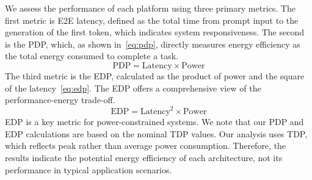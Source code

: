 We assess the performance of each platform using three primary metrics. 
The first metric is E2E latency, defined as the total time from prompt input to the generation of the first token, which indicates system responsiveness. 
The second is the PDP, which, as shown in~\eqref{eq:pdp}, directly measures energy efficiency as the total energy consumed to complete a task.
\begin{equation}
  \text{PDP} = \text{Latency} \times \text{Power}
  \label{eq:pdp}
\end{equation}
The third metric is the EDP, calculated as the product of power and the square of the latency~\eqref{eq:edp}.
The EDP offers a comprehensive view of the performance-energy trade-off.
\begin{equation}
  \text{EDP} =  \text{Latency}^2 \times \text{Power}
  \label{eq:edp}
\end{equation}
EDP is a key metric for power-constrained systems. 
We note that our PDP and EDP calculations are based on the nominal TDP values. 
Our analysis uses TDP, which reflects peak rather than average power consumption. 
Therefore, the results indicate the potential energy efficiency of each architecture, not its performance in typical application scenarios.



